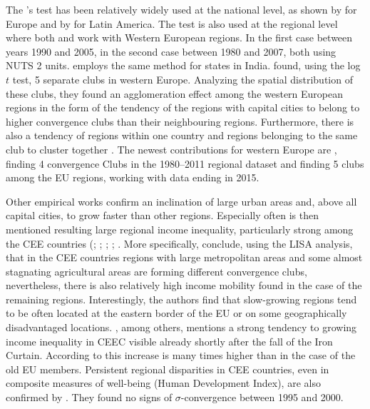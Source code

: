 \documentclass[11pt]{article}
\begin{document}
The \cite{phillips2007transition}'s test
has been relatively widely used at the national level, as shown by \citet{borsi2015evolution, fritsche2011analysing, monfort2013real,apergis2010old} for Europe and by \citet{rodriguez2014there} for Latin America. The test is also used at the regional level where both \citet{bartkowska2012regional} and \citet{pinho2010regional} work with Western European regions. In the first case between years 1990 and 2005, in the second case between 1980 and 2007, both using NUTS 2 units. \citet{ghosh2013regional} employs the same method for states in India. \citet{bartkowska2012regional} found, using the log $t$ test, 5 separate clubs in western Europe. Analyzing the spatial distribution of these clubs, they found an agglomeration effect among the western European regions in the form of the tendency of the regions with capital cities to belong to higher convergence clubs than their neighbouring regions. Furthermore, there is also a tendency of regions within one country and regions belonging to the same club to cluster together \citep{bartkowska2012regional}. The newest contributions for western Europe are \citet{von2017regional}, finding 4 convergence Clubs in the 1980–2011 regional dataset and \citet{cutrini2019economic} finding 5 clubs among the EU regions, working with data ending in 2015. 

Other empirical works confirm an inclination of large urban areas and, above all capital cities, to grow faster than other regions. Especially often is then mentioned resulting large regional income inequality, particularly strong among the CEE countries (\citet{cuaresma2014determinants}; \citet{sme2012regional}; \citet{szendi2013convergence}; \citet{chapman2012income}; \citet{monastiriotis2011regional}. 
More specifically, \citet{sme2012regional} conclude, using the LISA analysis, that in the CEE countries regions with large metropolitan areas and some almost stagnating agricultural areas are forming different convergence clubs, nevertheless, there is also relatively high income mobility found in the case of the remaining regions. Interestingly, the authors find that  slow-growing regions tend to be often located at the eastern border of the EU or on some geographically disadvantaged locations. \citet{monastiriotis2011regional}, among others, mentions a strong tendency to growing income inequality in CEEC visible already shortly after the fall of the Iron Curtain. According to \citeauthor{monastiriotis2011regional} this increase is many times higher than in the case of the old EU members. Persistent regional disparities in CEE countries, even in composite measures of well-being (Human Development Index), are also confirmed by \citet{benedek2015paths}. They found no signs of $\sigma$-convergence between 1995 and 2000.  
\end{document}
